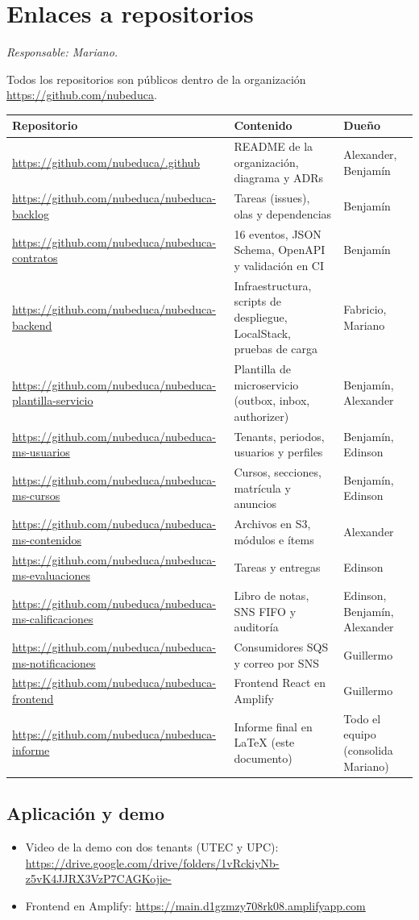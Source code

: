 \section{Enlaces a repositorios}
\label{sec:repos}
\textit{Responsable: Mariano.}

Todos los repositorios son públicos dentro de la organización \url{https://github.com/nubeduca}.

\begin{longtable}{p{}p{}p{}}
\toprule
Repositorio & Contenido & Dueño \\
\midrule
\endhead
\url{https://github.com/nubeduca/.github} & README de la organización, diagrama y ADRs & Alexander, Benjamín \\
\url{https://github.com/nubeduca/nubeduca-backlog} & Tareas (issues), olas y dependencias & Benjamín \\
\url{https://github.com/nubeduca/nubeduca-contratos} & 16 eventos, JSON Schema, OpenAPI y validación en CI & Benjamín \\
\url{https://github.com/nubeduca/nubeduca-backend} & Infraestructura, scripts de despliegue, LocalStack, pruebas de carga & Fabricio, Mariano \\
\url{https://github.com/nubeduca/nubeduca-plantilla-servicio} & Plantilla de microservicio (outbox, inbox, authorizer) & Benjamín, Alexander \\
\url{https://github.com/nubeduca/nubeduca-ms-usuarios} & Tenants, periodos, usuarios y perfiles & Benjamín, Edinson \\
\url{https://github.com/nubeduca/nubeduca-ms-cursos} & Cursos, secciones, matrícula y anuncios & Benjamín, Edinson \\
\url{https://github.com/nubeduca/nubeduca-ms-contenidos} & Archivos en S3, módulos e ítems & Alexander \\
\url{https://github.com/nubeduca/nubeduca-ms-evaluaciones} & Tareas y entregas & Edinson \\
\url{https://github.com/nubeduca/nubeduca-ms-calificaciones} & Libro de notas, SNS FIFO y auditoría & Edinson, Benjamín, Alexander \\
\url{https://github.com/nubeduca/nubeduca-ms-notificaciones} & Consumidores SQS y correo por SNS & Guillermo \\
\url{https://github.com/nubeduca/nubeduca-frontend} & Frontend React en Amplify & Guillermo \\
\url{https://github.com/nubeduca/nubeduca-informe} & Informe final en LaTeX (este documento) & Todo el equipo (consolida Mariano) \\
\bottomrule
\end{longtable}

\subsection{Aplicación y demo}
\begin{itemize}
  \item Video de la demo con dos tenants (UTEC y UPC): \url{https://drive.google.com/drive/folders/1vRckiyNb-z5vK4JJRX3VzP7CAGKojie-}
  \item Frontend en Amplify: \url{https://main.d1gzmzy708rk08.amplifyapp.com}
\end{itemize}
